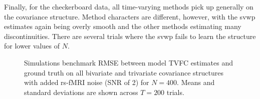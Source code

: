 Finally, for the checkerboard data, all time-varying methods pick up generally on the covariance structure.
Method characters are different, however, with the \gls{svwp} estimates again being overly smooth and the other methods estimating many discontinuities.
There are several trials where the \gls{svwp} fails to learn the structure for lower values of $N$.


\begin{figure}[ht]
  \centering
  \caption{
    Simulations benchmark RMSE between model TVFC estimates and ground truth on all bivariate and trivariate covariance structures with added rs-fMRI noise (SNR of 2) for $N = 400$.
    Means and standard deviations are shown across $T = 200$ trials.
  }\label{fig:sim-results-HCP-noise-all}
\end{figure}


